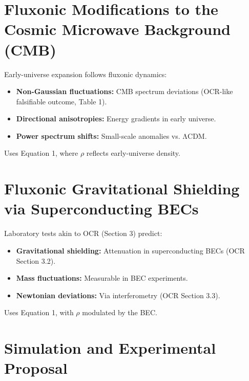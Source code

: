 \documentclass{article}
\begin{document}
\section{Fluxonic Modifications to the Cosmic Microwave Background (CMB)}
Early-universe expansion follows fluxonic dynamics:
\begin{itemize}
    \item \textbf{Non-Gaussian fluctuations:} CMB spectrum deviations (OCR-like falsifiable outcome, Table 1).
    \item \textbf{Directional anisotropies:} Energy gradients in early universe.
    \item \textbf{Power spectrum shifts:} Small-scale anomalies vs. ΛCDM.
\end{itemize}
Uses Equation 1, where \(\rho\) reflects early-universe density.

\section{Fluxonic Gravitational Shielding via Superconducting BECs}
Laboratory tests akin to OCR (Section 3) predict:
\begin{itemize}
    \item \textbf{Gravitational shielding:} Attenuation in superconducting BECs (OCR Section 3.2).
    \item \textbf{Mass fluctuations:} Measurable in BEC experiments.
    \item \textbf{Newtonian deviations:} Via interferometry (OCR Section 3.3).
\end{itemize}
Uses Equation 1, with \(\rho\) modulated by the BEC.

\section{Simulation and Experimental Proposal}
\end{document}
